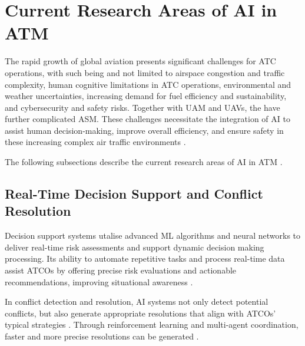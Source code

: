 \section{Current Research Areas of AI in ATM}

The rapid growth of global aviation presents significant challenges for ATC operations, with such being and not limited to airspace congestion and traffic complexity, human cognitive limitations in \gls{ATC} operations, environmental and weather uncertainties, increasing demand for fuel efficiency and sustainability, and cybersecurity and safety risks. 
Together with \gls{UAM} and \glspl{UAV}, the have further complicated \gls{ASM}.
These challenges necessitate the integration of \gls{AI} to assist human decision-making, improve overall efficiency, and ensure safety in these increasing complex air traffic environments \cite{Ramachandran_2025}. 

The following subsections describe the current research areas of \gls{AI} in \gls{ATM}  \cite{Ramachandran_2025}.


\subsection{Real-Time Decision Support and Conflict Resolution}

Decision support systems utalise advanced \gls{ML} algorithms and neural networks to deliver real-time risk assessments and support dynamic decision making processing. 
Its ability to automate repetitive tasks and process real-time data assist \glspl{ATCO} by offering precise risk evaluations and actionable recommendations, improving situational awareness \cite{Meier_2024}. 

In conflict detection and resolution, \gls{AI} systems not only detect potential conflicts, but also generate appropriate resolutions that align with \glspl{ATCO}' typical strategies \cite{Meier_2024}.
Through reinforcement learning and multi-agent coordination, faster and more precise resolutions can be generated \cite{Ramachandran_2025}.





